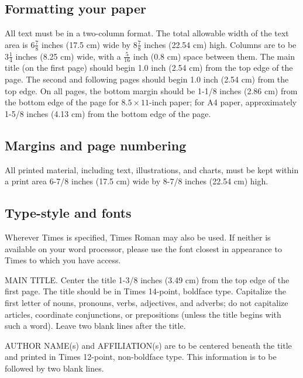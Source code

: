 \documentclass[10pt,twocolumn,letterpaper]{article}
\begin{document}
\subsection{Formatting your paper}

All text must be in a two-column format. The total allowable width of the
text area is $6\frac78$ inches (17.5 cm) wide by $8\frac78$ inches (22.54
cm) high. Columns are to be $3\frac14$ inches (8.25 cm) wide, with a
$\frac{5}{16}$ inch (0.8 cm) space between them. The main title (on the
first page) should begin 1.0 inch (2.54 cm) from the top edge of the
page. The second and following pages should begin 1.0 inch (2.54 cm) from
the top edge. On all pages, the bottom margin should be 1-1/8 inches (2.86
cm) from the bottom edge of the page for $8.5 \times 11$-inch paper; for A4
paper, approximately 1-5/8 inches (4.13 cm) from the bottom edge of the
page.

\subsection{Margins and page numbering}

All printed material, including text, illustrations, and charts, must be kept
within a print area 6-7/8 inches (17.5 cm) wide by 8-7/8 inches (22.54 cm)
high.



\subsection{Type-style and fonts}

Wherever Times is specified, Times Roman may also be used. If neither is
available on your word processor, please use the font closest in
appearance to Times to which you have access.

MAIN TITLE. Center the title 1-3/8 inches (3.49 cm) from the top edge of
the first page. The title should be in Times 14-point, boldface type.
Capitalize the first letter of nouns, pronouns, verbs, adjectives, and
adverbs; do not capitalize articles, coordinate conjunctions, or
prepositions (unless the title begins with such a word). Leave two blank
lines after the title.

AUTHOR NAME(s) and AFFILIATION(s) are to be centered beneath the title
and printed in Times 12-point, non-boldface type. This information is to
be followed by two blank lines.
\end{document}
